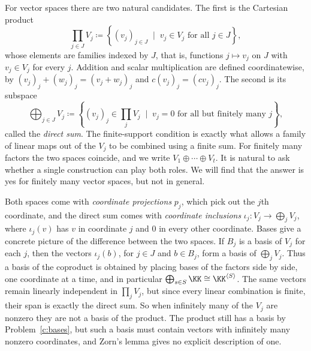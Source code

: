\documentclass[12pt,reqno]{amsart}
\begin{document}
For vector spaces there are two natural candidates. The first is the Cartesian product
\[
\prod_{j\in J}V_j\coloneqq\left\{(v_j)_{j\in J} \;\; \big| \;\; v_j\in V_j\text{ for all }j\in J\right\},
\]
whose elements are families indexed by $J$, that is, functions $j\mapsto v_j$ on $J$ with $v_j\in V_j$ for every $j$. Addition and scalar multiplication are defined coordinatewise, by $(v_j)_j+(w_j)_j=(v_j+w_j)_j$ and $c(v_j)_j=(cv_j)_j$. The second is its subspace
\[
\bigoplus_{j\in J}V_j\coloneqq\left\{(v_j)_j\in\prod_jV_j \;\; \big| \;\; v_j=0\text{ for all but finitely many }j\right\},
\]
called the \emph{direct sum}. The finite-support condition is exactly what allows a family of linear maps out of the $V_j$ to be combined using a finite sum. For finitely many factors the two spaces coincide, and we write $V_1\oplus\cdots\oplus V_t$. It is natural to ask whether a single construction can play both roles. We will find that the answer is yes for finitely many vector spaces, but not in general.

Both spaces come with \emph{coordinate projections} $p_j$, which pick out the $j$th coordinate, and the direct sum comes with \emph{coordinate inclusions} $\iota_j:V_j\to\bigoplus_jV_j$, where $\iota_j(v)$ has $v$ in coordinate $j$ and $0$ in every other coordinate. Bases give a concrete picture of the difference between the two spaces. If $B_j$ is a basis of $V_j$ for each $j$, then the vectors $\iota_j(b)$, for $j\in J$ and $b\in B_j$, form a basis of $\bigoplus_jV_j$. Thus a basis of the coproduct is obtained by placing bases of the factors side by side, one coordinate at a time, and in particular $\bigoplus_{s\in S}\KK\cong\KK^{\langle S\rangle}$. The same vectors remain linearly independent in $\prod_jV_j$, but since every linear combination is finite, their span is exactly the direct sum. So when infinitely many of the $V_j$ are nonzero they are not a basis of the product. The product still has a basis by Problem~\ref{c:bases}, but such a basis must contain vectors with infinitely many nonzero coordinates, and Zorn's lemma gives no explicit description of one.

\hrulefill
\end{document}
